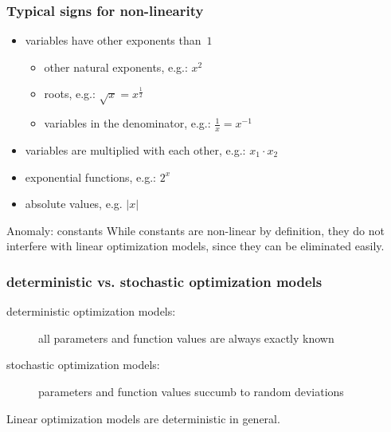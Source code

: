 \begin{frame}
 \frametitle{Typical signs for non-linearity}
 \begin{itemize}
  \item variables have other exponents than~$1$
  \begin{itemize}
   \item other natural exponents, e.g.: $x^2$
   \item roots, e.g.: $\sqrt{x} = x^{\frac{1}{2}}$
   \item variables in the denominator, e.g.: $\frac{1}{x} = x^{-1}$
  \end{itemize}
  \item variables are multiplied with each other, e.g.: $x_1\cdot x_2$
  \item exponential functions, e.g.: $2^x$
  \item absolute values, e.g. $|x|$
 \end{itemize}

 \begin{block}{Anomaly: constants}
  While constants are non-linear by definition, they do not interfere with linear optimization models, since they can be eliminated easily.
 \end{block}
\end{frame}

\begin{frame}
 \frametitle{deterministic vs. stochastic optimization models}
 \begin{description}
  \item[deterministic optimization models:] all parameters and function values are always exactly known
  \item[stochastic optimization models:] parameters and function values succumb to random deviations
 \end{description}
 
 Linear optimization models are deterministic in general.
\end{frame}

